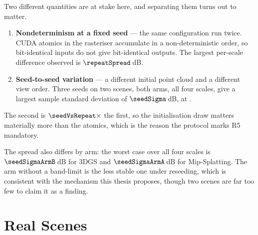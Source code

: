 

Two different quantities are at stake here, and separating them turns out to
matter.

\begin{enumerate}[leftmargin=1.4em,itemsep=3pt]
  \item \textbf{Nondeterminism at a fixed seed} --- the same configuration run
        twice. CUDA atomics in the rasteriser accumulate in a non-deterministic
        order, so bit-identical inputs do not give bit-identical outputs. The
        largest per-scale difference observed is $\repeatSpread$\,dB.
  \item \textbf{Seed-to-seed variation} --- a different initial point cloud and a
        different view order. Three seeds on two scenes, both arms, all four
        scales, give a largest sample standard deviation of
        $\mathbf{\seedSigma}$\,dB, at \seedSigmaWhere.
\end{enumerate}

The second is $\seedVsRepeat\times$ the first, so the initialisation draw matters materially more than the atomics, which is
the reason the protocol marks R5 mandatory.


The spread also differs by arm: the worst case over all four scales is
$\seedSigmaArmB$\,dB for 3DGS and $\seedSigmaArmA$\,dB for Mip-Splatting. The
arm without a band-limit is the less stable one under reseeding, which is
consistent with the mechanism this thesis proposes, though two scenes are far
too few to claim it as a finding.

\section{Real Scenes}
\label{sec:real}

